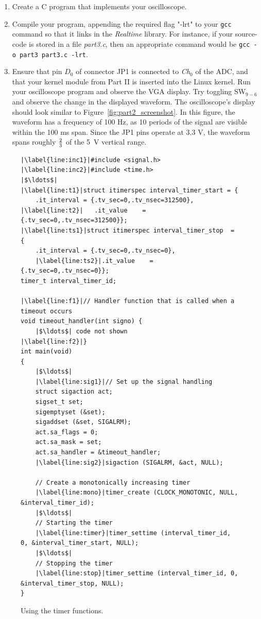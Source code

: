 \documentclass[epsfig,10pt,fullpage]{article}
\begin{document}
\begin{enumerate}
\item Create a C program that implements your oscilloscope.

\item Compile your program, appending the required flag "-lrt" to your \texttt{gcc} command 
so that it links in the \textit{Realtime} library. For instance, if your source-code is
stored in a file {\it part3.c}, then an appropriate command would be 
\texttt{gcc -o part3 part3.c -lrt}.

\item Ensure that pin $D_0$ of connector JP1 is connected to {\it Ch}$_0$ of the ADC, and that
your kernel module from Part II is inserted into the Linux kernel. Run your oscilloscope
program and observe the VGA display. Try toggling SW$_{9-6}$ and observe the change in the 
displayed waveform. The oscilloscope's display should look similar to 
Figure~\ref{fig:part2_screenshot}. In this figure, the waveform has a frequency of 100 Hz, 
as 10 periods of the signal are visible within the 100 ms span. Since the JP1 pins operate 
at 3.3 V, the waveform spans roughly $2 \over 3$ of the 5~V vertical range.
\end{enumerate}

\lstset{language=C,numbers=left,escapechar=|}
\begin{figure}[H]
\begin{center}
\begin{minipage}[t]{16 cm}
\begin{lstlisting}
|\label{line:inc1}|#include <signal.h>
|\label{line:inc2}|#include <time.h>
|$\ldots$|
|\label{line:t1}|struct itimerspec interval_timer_start = {
	.it_interval = {.tv_sec=0,.tv_nsec=312500},
|\label{line:t2}|	.it_value    = {.tv_sec=0,.tv_nsec=312500}};
|\label{line:ts1}|struct itimerspec interval_timer_stop  = {
 	.it_interval = {.tv_sec=0,.tv_nsec=0},
	|\label{line:ts2}|.it_value    = {.tv_sec=0,.tv_nsec=0}};
timer_t interval_timer_id;

|\label{line:f1}|// Handler function that is called when a timeout occurs
void timeout_handler(int signo) {
	|$\ldots$| code not shown 
|\label{line:f2}|}
int main(void)
{
	|$\ldots$| 
	|\label{line:sig1}|// Set up the signal handling
	struct sigaction act;
	sigset_t set;
	sigemptyset (&set);
	sigaddset (&set, SIGALRM);
	act.sa_flags = 0;
	act.sa_mask = set;
	act.sa_handler = &timeout_handler;
	|\label{line:sig2}|sigaction (SIGALRM, &act, NULL);

	// Create a monotonically increasing timer
	|\label{line:mono}|timer_create (CLOCK_MONOTONIC, NULL, &interval_timer_id);
	|$\ldots$|
	// Starting the timer
	|\label{line:timer}|timer_settime (interval_timer_id, 0, &interval_timer_start, NULL);
	|$\ldots$|
	// Stopping the timer
	|\label{line:stop}|timer_settime (interval_timer_id, 0, &interval_timer_stop, NULL);
}
\end{lstlisting}
\end{minipage}
\end{center}
\vspace{-0.25in}\caption{Using the timer functions.}
\label{fig:timer_code}
\end{figure}
\end{document}
